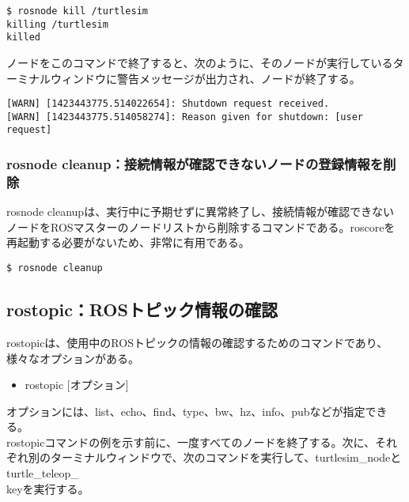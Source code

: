 \begin{lstlisting}[language=ROS]
$ rosnode kill /turtlesim
killing /turtlesim
killed
\end{lstlisting}

ノードをこのコマンドで終了すると、次のように、そのノードが実行しているターミナルウィンドウに警告メッセージが出力され、ノードが終了する。

\begin{lstlisting}[language=ROS]
[WARN] [1423443775.514022654]: Shutdown request received.
[WARN] [1423443775.514058274]: Reason given for shutdown: [user request]
\end{lstlisting}

\subsubsection{rosnode cleanup：接続情報が確認できないノードの登録情報を削除}

rosnode cleanupは、実行中に予期せずに異常終了し、接続情報が確認できないノードをROSマスターのノードリストから削除するコマンドである。roscoreを再起動する必要がないため、非常に有用である。

\begin{lstlisting}[language=ROS]
$ rosnode cleanup
\end{lstlisting}

\subsection{rostopic：ROSトピック情報の確認}

rostopicは、使用中のROSトピックの情報の確認するためのコマンドであり、様々なオプションがある。

\vspace{\baselineskip}
\begin{itemize}
\item  rostopic [オプション]
\end{itemize}
\vspace{\baselineskip}

オプションには、list、echo、find、type、bw、hz、info、pubなどが指定できる。\\

rostopicコマンドの例を示す前に、一度すべてのノードを終了する。次に、それぞれ別のターミナルウィンドウで、次のコマンドを実行して、turtlesim\_nodeとturtle\_teleop\_\\keyを実行する。

